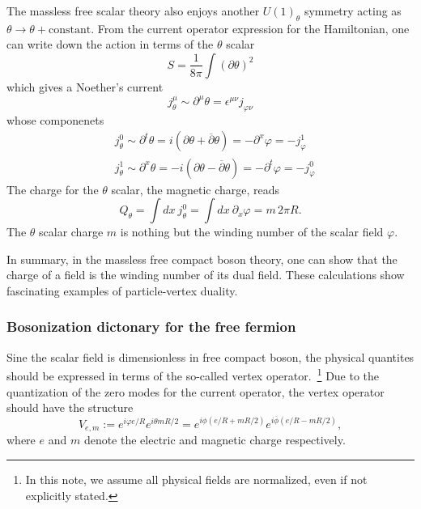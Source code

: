 The massless free scalar theory also enjoys another ${U(1)}_\theta$ symmetry acting as $\theta \rightarrow \theta + \mathrm{constant}$. From the current operator expression for the Hamiltonian, one can write down the action in terms of the $\theta$ scalar
\begin{equation}
	S = \frac{1}{8\pi}\int {\left(\partial \theta\right)}^2
\end{equation}
which gives a Noether's current
\begin{equation}
	j^\mu_\theta \sim \partial^\mu \theta = \epsilon^{\mu\nu}j_{\varphi\nu}
\end{equation}
whose componenets
\begin{equation}
	\begin{aligned}
		&j^0_\theta \sim \partial^t\theta = i \left(\partial \theta + \overline{\partial} {\theta}\right) = -\partial^x \varphi = -j^1_\varphi\\
		&j^1_\theta \sim \partial^x\theta = -i\left( \partial \theta - \overline{\partial}\theta \right) = -\partial^t \varphi = -j^0_\varphi
	\end{aligned}
\end{equation}
The charge for the $\theta$ scalar, the magnetic charge, reads
\begin{equation}
	Q_\theta = \int dx \ j^0_\theta = \int dx \ \partial_x \varphi = m\,2\pi R.
\end{equation}
The $\theta$ scalar charge $m$ is nothing but the winding number of the scalar field $\varphi$.

In summary, in the massless free compact boson theory, one can show that the charge of a field is the winding number of its dual field. These calculations show fascinating examples of particle-vertex duality. 



\subsubsection{Bosonization dictonary for the free fermion}
Sine the scalar field is dimensionless in free compact boson, the physical quantites should be expressed in terms of the so-called vertex operator.~\footnote{In this note, we assume all physical fields are normalized, even if not explicitly stated.} Due to the quantization of the zero modes for the current operator, the vertex operator should have the structure 
\begin{equation}
	V_{e,m} := e^{i \varphi e/R} e^{i\theta m R/2} = e^{i\phi \left(e/R + mR/2\right)} e^{i\overline{\phi} \left(e/R - mR/2\right)},	
\end{equation}
where $e$ and $m$ denote the electric and magnetic charge respectively.


